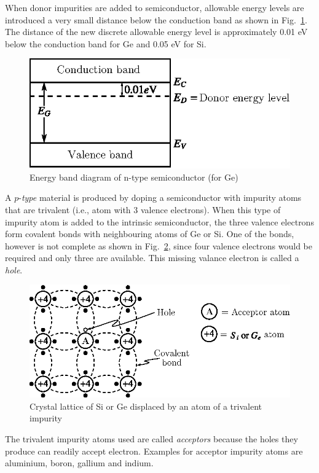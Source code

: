 When donor impurities are added to semiconductor, allowable energy levels are introduced a very small distance below the conduction band as shown in Fig.~\ref{fig1.12}. The distance of the new discrete allowable energy level is approximately 0.01 eV below the conduction band for Ge and 0.05 eV for Si.
\begin{figure}[H]
\centering
\includegraphics{chap1/fig1.12.eps}
\caption{Energy band diagram of n-type semiconductor (for Ge)}\label{fig1.12}
\end{figure}

A $p$-{\em type} material is produced by doping a semiconductor with impurity atoms that are trivalent (i.e., atom with 3 valence electrons). When this type of impurity atom is added to the intrinsic semiconductor, the three valence electrons form covalent bonds with neighbouring atoms of Ge or Si. One of the bonds, however is not complete as shown in Fig.~\ref{fig1.13}, since four valence electrons would be required and only three are available. This missing valance electron is called a {\em hole}.
\begin{figure}[H]
\centering
\includegraphics[scale=.93]{chap1/fig1.13.eps}
\caption{Crystal lattice of Si or Ge displaced by an atom of a trivalent impurity}\label{fig1.13}
\end{figure}

The trivalent impurity atoms used are called {\em acceptors} because the holes they produce can readily accept electron. Examples for acceptor impurity atoms are aluminium, boron, gallium and indium.

